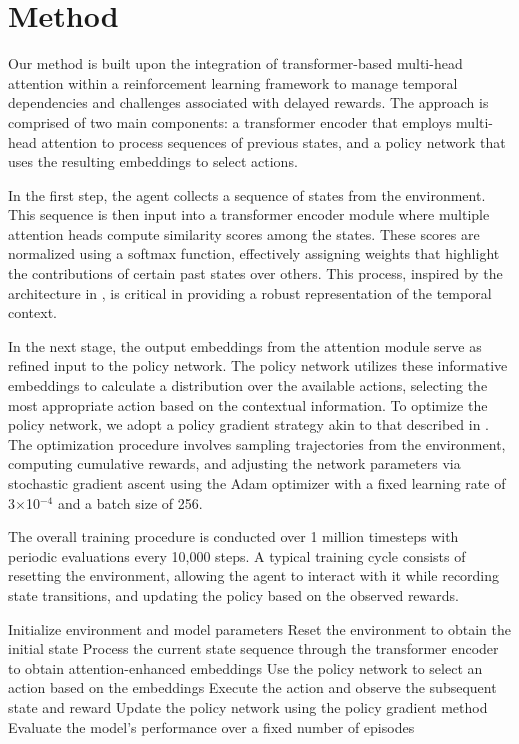 \documentclass{article} %
\begin{document}
\section{Method}
\label{sec:method}
Our method is built upon the integration of transformer-based multi-head attention within a reinforcement learning framework to manage temporal dependencies and challenges associated with delayed rewards. The approach is comprised of two main components: a transformer encoder that employs multi-head attention to process sequences of previous states, and a policy network that uses the resulting embeddings to select actions.

In the first step, the agent collects a sequence of states from the environment. This sequence is then input into a transformer encoder module where multiple attention heads compute similarity scores among the states. These scores are normalized using a softmax function, effectively assigning weights that highlight the contributions of certain past states over others. This process, inspired by the architecture in \cite{ashish_2017_attention}, is critical in providing a robust representation of the temporal context.

In the next stage, the output embeddings from the attention module serve as refined input to the policy network. The policy network utilizes these informative embeddings to calculate a distribution over the available actions, selecting the most appropriate action based on the contextual information. To optimize the policy network, we adopt a policy gradient strategy akin to that described in \cite{schulman_2017_ppo}. The optimization procedure involves sampling trajectories from the environment, computing cumulative rewards, and adjusting the network parameters via stochastic gradient ascent using the Adam optimizer with a fixed learning rate of 3\(\times\)10\(^{-4}\) and a batch size of 256.

The overall training procedure is conducted over 1 million timesteps with periodic evaluations every 10,000 steps. A typical training cycle consists of resetting the environment, allowing the agent to interact with it while recording state transitions, and updating the policy based on the observed rewards.

\begin{algorithm}[H]
\begin{algorithmic}[1]
  \State Initialize environment and model parameters
    \State Reset the environment to obtain the initial state
    \State Process the current state sequence through the transformer encoder to obtain attention-enhanced embeddings
    \State Use the policy network to select an action based on the embeddings
    \State Execute the action and observe the subsequent state and reward
    \State Update the policy network using the policy gradient method
      \State Evaluate the model's performance over a fixed number of episodes
    \EndIf
  \EndFor
\end{algorithmic}
\end{algorithm}
\end{document}
